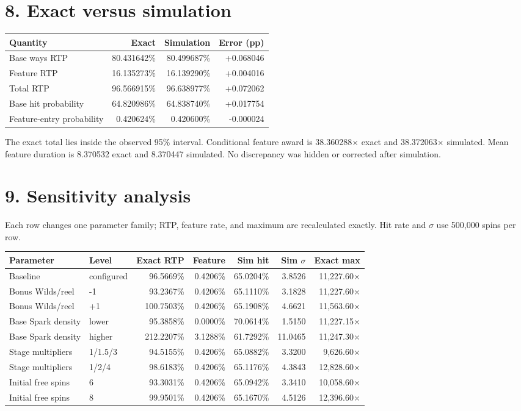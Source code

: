 \documentclass[10pt]{article}
\newcommand{\sectionbar}[1]{\vspace{8pt}{\color{acid}\rule{\linewidth}{1.5pt}}\vspace{-5pt}\section*{#1}}
\begin{document}
\sectionbar{8. Exact versus simulation}
\begin{center}\begin{tabular}{l r r r}
\hline Quantity & Exact & Simulation & Error (pp)\\\hline
Base ways RTP & 80.431642\% & 80.499687\% & +0.068046\\
Feature RTP & 16.135273\% & 16.139290\% & +0.004016\\
Total RTP & 96.566915\% & 96.638977\% & +0.072062\\
Base hit probability & 64.820986\% & 64.838740\% & +0.017754\\
Feature-entry probability & 0.420624\% & 0.420600\% & -0.000024\\\hline
\end{tabular}\end{center}

The exact total lies inside the observed 95\% interval. Conditional feature award is 38.360288× exact and 38.372063× simulated. Mean feature duration is 8.370532 exact and 8.370447 simulated. No discrepancy was hidden or corrected after simulation.

\sectionbar{9. Sensitivity analysis}
Each row changes one parameter family; RTP, feature rate, and maximum are recalculated exactly. Hit rate and $\sigma$ use 500,000 spins per row.

\scriptsize\begin{center}\begin{tabular}{l l r r r r r}
\hline Parameter & Level & Exact RTP & Feature & Sim hit & Sim $\sigma$ & Exact max\\\hline
Baseline & configured & 96.5669\% & 0.4206\% & 65.0204\% & 3.8526 & 11,227.60×\\
Bonus Wilds/reel & -1 & 93.2367\% & 0.4206\% & 65.1110\% & 3.1828 & 11,227.60×\\
Bonus Wilds/reel & +1 & 100.7503\% & 0.4206\% & 65.1908\% & 4.6621 & 11,563.60×\\
Base Spark density & lower & 95.3858\% & 0.0000\% & 70.0614\% & 1.5150 & 11,227.15×\\
Base Spark density & higher & 212.2207\% & 3.1288\% & 61.7292\% & 11.0465 & 11,247.30×\\
Stage multipliers & 1/1.5/3 & 94.5155\% & 0.4206\% & 65.0882\% & 3.3200 & 9,626.60×\\
Stage multipliers & 1/2/4 & 98.6183\% & 0.4206\% & 65.1176\% & 4.3843 & 12,828.60×\\
Initial free spins & 6 & 93.3031\% & 0.4206\% & 65.0942\% & 3.3410 & 10,058.60×\\
Initial free spins & 8 & 99.9501\% & 0.4206\% & 65.1670\% & 4.5126 & 12,396.60×\\\hline
\end{tabular}\end{center}\normalsize
\end{document}
